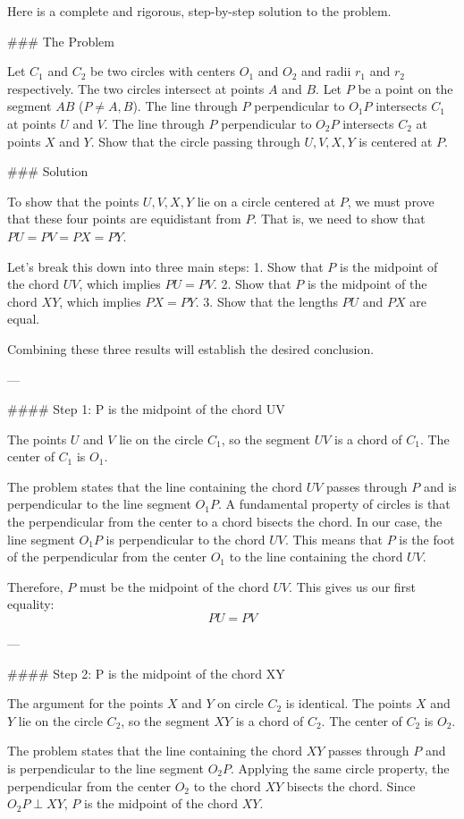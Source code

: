 Here is a complete and rigorous, step-by-step solution to the problem.

### The Problem

Let $C_1$ and $C_2$ be two circles with centers $O_1$ and $O_2$ and radii $r_1$ and $r_2$ respectively. The two circles intersect at points $A$ and $B$. Let $P$ be a point on the segment $AB$ ($P \ne A, B$). The line through $P$ perpendicular to $O_1P$ intersects $C_1$ at points $U$ and $V$. The line through $P$ perpendicular to $O_2P$ intersects $C_2$ at points $X$ and $Y$. Show that the circle passing through $U, V, X, Y$ is centered at $P$.

### Solution

To show that the points $U, V, X, Y$ lie on a circle centered at $P$, we must prove that these four points are equidistant from $P$. That is, we need to show that $PU = PV = PX = PY$.

Let's break this down into three main steps:
1.  Show that $P$ is the midpoint of the chord $UV$, which implies $PU = PV$.
2.  Show that $P$ is the midpoint of the chord $XY$, which implies $PX = PY$.
3.  Show that the lengths $PU$ and $PX$ are equal.

Combining these three results will establish the desired conclusion.

---

#### Step 1: P is the midpoint of the chord UV

The points $U$ and $V$ lie on the circle $C_1$, so the segment $UV$ is a chord of $C_1$. The center of $C_1$ is $O_1$.

The problem states that the line containing the chord $UV$ passes through $P$ and is perpendicular to the line segment $O_1P$.
A fundamental property of circles is that the perpendicular from the center to a chord bisects the chord. In our case, the line segment $O_1P$ is perpendicular to the chord $UV$. This means that $P$ is the foot of the perpendicular from the center $O_1$ to the line containing the chord $UV$.

Therefore, $P$ must be the midpoint of the chord $UV$. This gives us our first equality:
$$PU = PV$$

---

#### Step 2: P is the midpoint of the chord XY

The argument for the points $X$ and $Y$ on circle $C_2$ is identical.
The points $X$ and $Y$ lie on the circle $C_2$, so the segment $XY$ is a chord of $C_2$. The center of $C_2$ is $O_2$.

The problem states that the line containing the chord $XY$ passes through $P$ and is perpendicular to the line segment $O_2P$.
Applying the same circle property, the perpendicular from the center $O_2$ to the chord $XY$ bisects the chord. Since $O_2P \perp XY$, $P$ is the midpoint of the chord $XY$.

